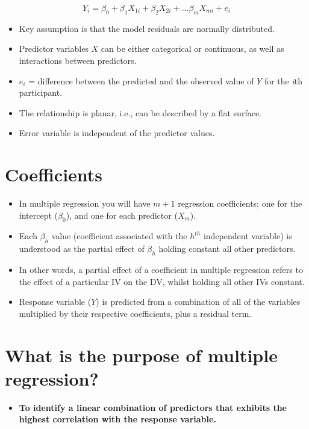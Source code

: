 \documentclass[
]{article}
\providecommand{\tightlist}{%
  \setlength{\itemsep}{0pt}\setlength{\parskip}{0pt}}
\begin{document}
\[Y_i = \beta_0 + \beta_1 X_{1i} + \beta_2 X_{2i} + ... \beta_mX_{mi} + e_i\]

\begin{itemize}
\item
  Key assumption is that the model residuals are normally distributed.
\item
  Predictor variables \(X\) can be either categorical or continuous, as
  well as interactions between predictors.
\item
  \(e_i\) = difference between the predicted and the observed value of
  \(Y\) for the \emph{i}th participant.
\item
  The relationship is planar, i.e., can be described by a flat surface.
\item
  Error variable is independent of the predictor values.
\end{itemize}

\hypertarget{coefficients}{%
\section{Coefficients}\label{coefficients}}

\begin{itemize}
\tightlist
\item
  In multiple regression you will have \(m+1\) regression coefficients;
  one for the intercept (\(\beta_0\)), and one for each predictor
  (\(X_m\)).
\item
  Each \(\beta_{h}\) value (coefficient associated with the \(h^{th}\)
  independent variable) is understood as the partial effect of
  \(\beta_{h}\) holding constant all other predictors.
\item
  In other words, a partial effect of a coefficient in multiple
  regression refers to the effect of a particular IV on the DV, whilst
  holding all other IVs constant.
\item
  Response variable (\(Y\)) is predicted from a combination of all of
  the variables multiplied by their respective coefficients, plus a
  residual term.
\end{itemize}

\hypertarget{what-is-the-purpose-of-multiple-regression}{%
\section{What is the purpose of multiple
regression?}\label{what-is-the-purpose-of-multiple-regression}}

\begin{itemize}
\tightlist
\item
  \textbf{To identify a linear combination of predictors that exhibits
  the highest correlation with the response variable.}
\end{itemize}
\end{document}
